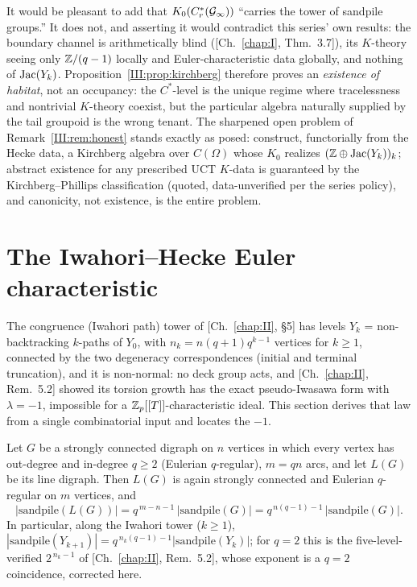 \begin{remark}
\label{III:rem:blindagain}
It would be pleasant to add that $K_0(C^*_r(\mathcal{G}_\infty))$ ``carries the tower of
sandpile groups.'' It does not, and asserting it would contradict this series' own
results: the boundary channel is arithmetically blind ([Ch.~\ref{chap:I}, Thm.~3.7]), its $K$-theory
seeing only $\mathbb{Z}/(q-1)$ locally and Euler-characteristic data globally, and nothing of
$\operatorname{Jac}(Y_k)$. Proposition~\ref{III:prop:kirchberg} therefore proves an \emph{existence of
habitat}, not an occupancy: the $C^*$-level is the unique regime where tracelessness
and nontrivial $K$-theory coexist, but the particular algebra naturally supplied by
the tail groupoid is the wrong tenant. The sharpened open problem of
Remark~\ref{III:rem:honest} stands exactly as posed: construct, functorially from the
Hecke data, a Kirchberg algebra over $C(\Omega)$ whose $K_0$ realizes
$(\mathbb{Z}\oplus\operatorname{Jac}(Y_k))_k$; abstract existence for any prescribed UCT $K$-data is
guaranteed by the Kirchberg--Phillips classification (quoted, data-unverified per the
series policy), and canonicity, not existence, is the entire problem.
\end{remark}

\section{The Iwahori--Hecke Euler characteristic}\label{III:sec:euler}

The congruence (Iwahori path) tower of [Ch.~\ref{chap:II}, \S5] has levels
$Y_k$ = non-backtracking $k$-paths of $Y_0$, with $n_k=n(q+1)q^{k-1}$ vertices for
$k\ge1$, connected by the two degeneracy correspondences (initial and terminal
truncation), and it is non-normal: no deck group acts, and [Ch.~\ref{chap:II}, Rem.~5.2] showed its
torsion growth has the exact pseudo-Iwasawa form with $\lambda=-1$, impossible for a
$\mathbb{Z}_p[[T]]$-characteristic ideal. This section derives that law from a single
combinatorial input and locates the $-1$.

\begin{theorem}\label{III:thm:recursion}
Let $G$ be a strongly connected digraph on $n$ vertices in which every vertex has
out-degree and in-degree $q\ge2$ (Eulerian $q$-regular), $m=qn$ arcs, and let $L(G)$
be its line digraph. Then $L(G)$ is again strongly connected and Eulerian
$q$-regular on $m$ vertices, and
\[
\bigl|\mathrm{sandpile}(L(G))\bigr|
=q^{\,m-n-1}\,\bigl|\mathrm{sandpile}(G)\bigr|
=q^{\,n(q-1)-1}\,\bigl|\mathrm{sandpile}(G)\bigr| .
\]
In particular, along the Iwahori tower ($k\ge1$),
$|\mathrm{sandpile}(Y_{k+1})|=q^{\,n_k(q-1)-1}|\mathrm{sandpile}(Y_k)|$; for $q=2$
this is the five-level-verified $2^{\,n_k-1}$ of [Ch.~\ref{chap:II}, Rem.~5.2], whose exponent is a
$q=2$ coincidence, corrected here.
\end{theorem}

